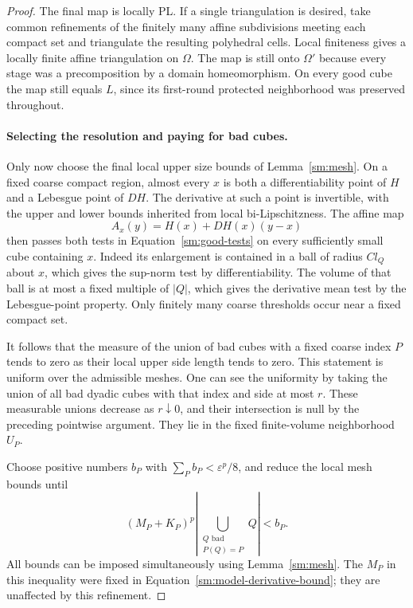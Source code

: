 \documentclass[11pt]{article}
\numberwithin{equation}{section}
\theoremstyle{definition}
\theoremstyle{remark}
\begin{document}
\begin{proof}
The final map is locally PL.  If a single triangulation is
desired, take common refinements of the
finitely many affine subdivisions meeting
each compact set and triangulate the resulting
polyhedral cells.  Local finiteness gives a
locally finite affine triangulation on
$\Omega$.  The map is still onto $\Omega'$
because every stage was a precomposition by
a domain homeomorphism.  On every good cube
the map still equals $L$, since its first-round
protected neighborhood was preserved throughout.

\paragraph{Selecting the resolution and paying for bad cubes.}
Only now choose the final local upper size
bounds of Lemma~\ref{sm:mesh}.  On a fixed
coarse compact region, almost every $x$ is
both a differentiability point of $H$ and a
Lebesgue point of $DH$.  The derivative at
such a point is invertible, with the upper
and lower bounds inherited from local
bi-Lipschitzness.  The affine map
\[
 A_x(y)=H(x)+DH(x)(y-x)
\]
then passes both tests in
Equation~\eqref{sm:good-tests} on every sufficiently
small cube containing $x$.  Indeed its
enlargement is contained in a ball of radius
$C l_Q$ about $x$, which gives the sup-norm
test by differentiability.  The volume of
that ball is at most a fixed multiple of
$|Q|$, which gives the derivative mean test
by the Lebesgue-point property.  Only
finitely many coarse thresholds occur near
a fixed compact set.

It follows that the measure of the union of
bad cubes with a fixed coarse index $P$
tends to zero as their local upper side
length tends to zero.  This statement is
uniform over the admissible meshes.  One
can see the uniformity by taking the union
of all bad dyadic cubes with that index
and side at most $r$.  These measurable
unions decrease as $r\downarrow0$, and
their intersection is null by the preceding
pointwise argument.  They lie in the fixed
finite-volume neighborhood $U_P$.

Choose positive numbers $b_P$ with
$\sum_Pb_P<\varepsilon^p/8$, and reduce the
local mesh bounds until
\begin{equation}
 \label{sm:bad-error-budget}
 (M_P+K_P)^p
 \left|\bigcup_{\substack{Q\text{ bad}\\P(Q)=P}}Q\right|
 <b_P.
\end{equation}
All bounds can be imposed simultaneously
using Lemma~\ref{sm:mesh}.  The $M_P$ in
this inequality were fixed in
Equation~\eqref{sm:model-derivative-bound}; they
are unaffected by this refinement.


\end{proof}
\end{document}
